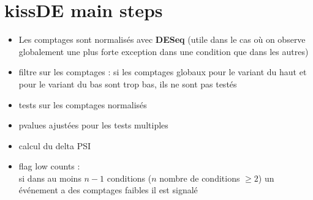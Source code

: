 \documentclass[a4paper,10pt]{article}
\title{}
\author{}
\begin{document}
\maketitle

\section{kissDE main steps}
\begin{itemize}
 \item Les comptages sont normalisés avec \textbf{DESeq} (utile dans le cas où on observe globalement une plus forte exception dans une condition que dans les autres)
 \item filtre sur les comptages : si les comptages globaux pour le variant du haut et pour le variant du bas sont trop bas, ils ne sont pas testés
 \item tests sur les comptages normalisés
 \item pvalues ajustées pour les tests multiples
 \item calcul du delta PSI
 \item flag low counts :\\
si dans au moins $n-1$ conditions ($n$ nombre de conditions $\geq 2$) un événement a des comptages faibles il est signalé
\end{itemize}
\end{document}
